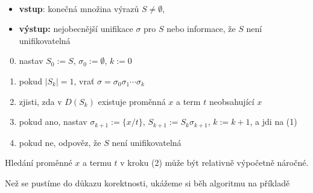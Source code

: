 \begin{algorithm}{\,}
\begin{itemize}
    \item \textbf{vstup}: konečná množina výrazů $S\neq\emptyset$,
    \item \textbf{výstup:} nejobecnější unifikace $\sigma$ pro $S$ nebo informace, že $S$ není unifikovatelná
\end{itemize}
\begin{enumerate}[(1)]\setcounter{enumi}{-1}
    \item nastav $S_0:=S$, $\sigma_0:=\emptyset$, $k:=0$
    \item pokud $|S_k|=1$, vrať $\sigma=\sigma_0\sigma_1\cdots \sigma_k$
    \item zjisti, zda v $D(S_k)$ existuje proměnná $x$ a term $t$ \alert{neobsahující} $x$
    \item pokud ano, nastav $\sigma_{k+1}:=\{x/t\}$, $S_{k+1}:=S_k\sigma_{k+1}$, $k:=k+1$, a jdi na (1)
    \item pokud ne, odpověz, že $S$ není unifikovatelná
\end{enumerate}
\end{algorithm}

\begin{remark}
    Hledání proměnné $x$ a termu $t$ v kroku (2) může být relativně výpočetně náročné.
\end{remark}

Než se pustíme do důkazu korektnosti, ukážeme si běh algoritmu na příkladě


